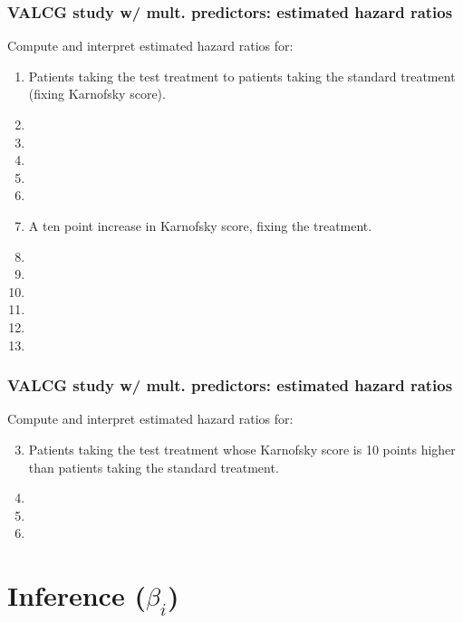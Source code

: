 \begin{frame}
\frametitle{VALCG study w/ mult. predictors: estimated hazard ratios}
Compute and interpret estimated hazard ratios for:
\begin{enumerate}
\item Patients taking the test treatment to patients taking the standard treatment (fixing Karnofsky score).
\item[]
\item[]
\item[]
\item[]
\item[]
\item A ten point increase in Karnofsky score, fixing the treatment.
\item[]
\item[]
\item[]
\item[]
\item[]
\item[]
\end{enumerate}
\end{frame}

\begin{frame}
\frametitle{VALCG study w/ mult. predictors: estimated hazard ratios}
Compute and interpret estimated hazard ratios for:
\begin{enumerate}
\setcounter{enumi}{2}
\item Patients taking the test treatment whose Karnofsky score is 10 points higher than patients taking the standard treatment.
\item[]
\item[]
\item[]
\end{enumerate}
\vskip200pt
\end{frame}

\section[Inference ($\beta_i$)]{Inference ($\beta_i$)}
\subsection{}
\begin{frame}
\end{frame}


